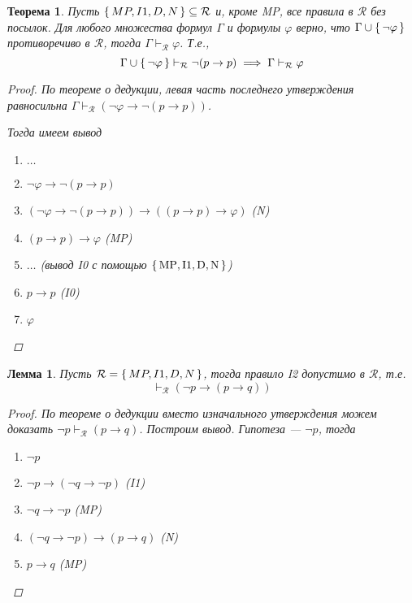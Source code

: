 \documentclass[12pt]{article}
\let\im\rightarrow
\let\n\neg
\let\un\cup
\let\sus\subseteq
\theoremstyle{definition}
\theoremstyle{plain}
\newtheorem{theorem}{Теорема}[section]
\newtheorem{lemma}{Лемма}[section]
\theoremstyle{remark}
\begin{document}
\begin{theorem}
  Пусть $\set{MP, I1, D, N} \sus \mathcal{R}$ и, кроме MP, все
  правила в $\mathcal{R}$ без посылок. Для любого множества формул
  $\Gamma$ и формулы $\varphi$ верно, что $\Gamma \un \set{\n
  \varphi}$ противоречиво в $\mathcal{R}$, тогда $\Gamma
  \vdash_{\mathcal{R}} \varphi$. Т.е.,
  \begin{displaymath}
    \Gamma \un \set{\n \varphi} \vdash_{\mathcal{R}} \n (p \im p)
    \implies \Gamma \vdash_{\mathcal{R}} \varphi
  \end{displaymath}
  \begin{proof}
    По теореме о дедукции, левая часть последнего утверждения
    равносильна $\Gamma \vdash_{\mathcal{R}} (\n \varphi \im \n (p \im p))$.

    Тогда имеем вывод
    \begin{enumerate}
      \item $\dots$

      \item $\n \varphi \im \n (p \im p)$

      \item $(\n \varphi \im \n (p \im p)) \im ((p \im p) \im \varphi)$ (N)

      \item $(p \im p) \im \varphi$ (MP)

      \item $\dots$ (вывод I0 с помощью $\set{\mathrm{MP},
        \mathrm{I1}, \mathrm{D}, \mathrm{N}}$)

      \item $p \im p$ (I0)

      \item $\varphi$
    \end{enumerate}
  \end{proof}
\end{theorem}

\begin{lemma}
  Пусть $\mathcal{R} = \set{MP, I1, D, N}$, тогда правило I2
  допустимо в $\mathcal{R}$, т.е.
  \begin{displaymath}
    \vdash_{\mathcal{R}} (\n p \im (p \im q))
  \end{displaymath}
  \begin{proof}
    По теореме о дедукции вместо изначального утверждения можем
    доказать $\n p \vdash_{\mathcal{R}} (p \im q)$. Построим вывод.
    Гипотеза --- $\n p$, тогда
    \begin{enumerate}
      \item $\n p$

      \item $\n p \im (\n q \im \n p)$ (I1)

      \item $\n q \im \n p$ (MP)

      \item $(\n q \im \n p) \im (p \im q)$ (N)

      \item $p \im q$ (MP)
    \end{enumerate}
  \end{proof}
\end{lemma}
\end{document}
